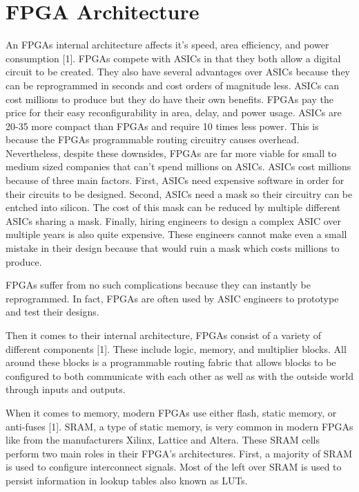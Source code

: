 \documentclass{article}
\begin{document}
    \break
        
    \section{FPGA Architecture}

    An FPGAs internal architecture affects it's speed, area efficiency, and power consumption [1].
    FPGAs compete with ASICs in that they both allow a digital circuit to be created.
    They also have several advantages over ASICs because they can be reprogrammed in seconds
    and cost orders of magnitude less. ASICs can cost millions to produce but they do have
    their own benefits. FPGAs pay the price for their easy reconfigurability in area, delay,
    and power usage. ASICs are 20-35 more compact than FPGAs and require 10 times less power.
    This is because the FPGAs programmable routing circuitry causes overhead. Nevertheless,
    despite these downsides, FPGAs are far more viable for small to medium sized companies
    that can't spend millions on ASICs. ASICs cost millions because of three main factors.
    First, ASICs need expensive software in order for their circuits to be designed.
    Second, ASICs need a mask so their circuitry can be entched into silicon.
    The cost of this mask can be reduced by multiple different ASICs sharing a mask.
    Finally, hiring engineers to design a complex ASIC over multiple years is also quite
    expensive. These engineers cannot make even a small mistake in their design
    because that would ruin a mask which costs millions to produce.

    FPGAs suffer from no such complications because they can instantly be reprogrammed.
    In fact, FPGAs are often used by ASIC engineers to prototype and test their designs.

    Then it comes to their internal architecture, FPGAs consist of a variety of different
    components [1]. These include logic, memory, and multiplier blocks. All around these
    blocks is a programmable routing fabric that allows blocks to be configured to both
    communicate with each other as well as with the outside world through inputs and outputs.

    When it comes to memory, modern FPGAs use either flash, static memory, or anti-fuses [1].
    SRAM, a type of static memory, is very common in modern FPGAs like from the manufacturers
    Xilinx, Lattice and Altera. These SRAM cells perform two main roles in their FPGA's
    architectures. First, a majority of SRAM is used to configure interconnect signals.
    Most of the left over SRAM is used to persist information in lookup tables also known as
    LUTs.
\end{document}
